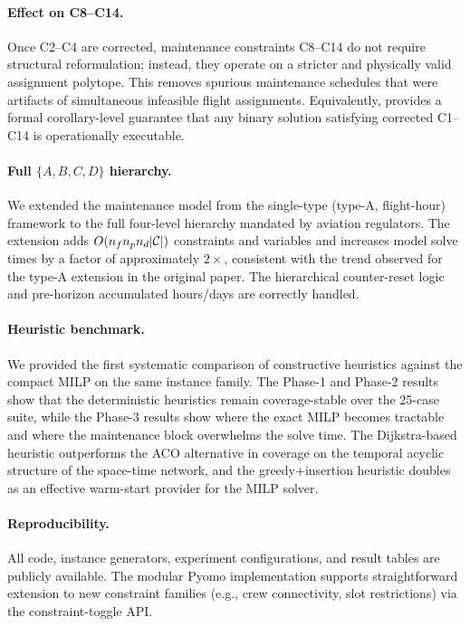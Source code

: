 \paragraph{Effect on C8--C14.}
Once C2--C4 are corrected, maintenance constraints C8--C14 do not require
structural reformulation; instead, they operate on a stricter and physically
valid assignment polytope.  This removes spurious maintenance schedules that
were artifacts of simultaneous infeasible flight assignments.
Equivalently,  provides a formal
corollary-level guarantee that any binary solution satisfying corrected
C1--C14 is operationally executable.

\paragraph{Full $\{A,B,C,D\}$ hierarchy.}
We extended the maintenance model from the single-type (type-A, flight-hour)
framework to the full four-level hierarchy mandated by aviation regulators.
The extension adds $O(n_f n_p n_d |\mathcal{C}|)$ constraints and variables and
increases model solve times by a factor of approximately $2\times$, consistent
with the trend observed for the type-A extension in the original paper.  The
hierarchical counter-reset logic and pre-horizon accumulated hours/days are
correctly handled.

\paragraph{Heuristic benchmark.}
We provided the first systematic comparison of constructive heuristics against
the compact MILP on the same instance family.  The Phase-1 and Phase-2
results show that the deterministic heuristics remain coverage-stable over the
25-case suite, while the Phase-3 results show where the exact MILP becomes
tractable and where the maintenance block overwhelms the solve time.  The
Dijkstra-based heuristic outperforms the ACO alternative in coverage on the
temporal acyclic structure of the space-time network, and the greedy+insertion
heuristic doubles as an effective warm-start provider for the MILP solver.

\paragraph{Reproducibility.}
All code, instance generators, experiment configurations, and result tables are
publicly available.  The modular Pyomo implementation supports straightforward
extension to new constraint families (e.g., crew connectivity, slot
restrictions) via the constraint-toggle API.

